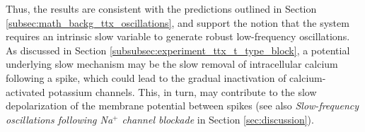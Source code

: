 \documentclass[../main.tex]{subfiles}
\begin{document}
Thus, the results are consistent with the predictions outlined in Section \ref{subsec:math_backg_ttx_oscillations}, and support the notion that the system requires an intrinsic slow variable to generate robust low-frequency oscillations. As discussed in Section \ref{subsubsec:experiment_ttx_t_type_block}, a potential underlying slow mechanism may be the slow removal of intracellular calcium following a spike, which could lead to the gradual inactivation of calcium-activated potassium channels. This, in turn, may contribute to the slow depolarization of the membrane potential between spikes (see also \textit{Slow-frequency oscillations following Na$^+$ channel blockade} in Section \ref{sec:discussion}).
\end{document}
